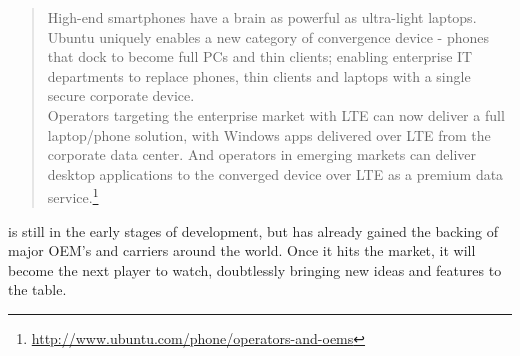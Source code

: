 \begin{quotation}
High-end smartphones have a brain as powerful as ultra-light laptops. Ubuntu uniquely enables a new category of convergence device - phones that dock to become full PCs and thin clients; enabling enterprise IT departments to replace phones, thin clients and laptops with a single secure corporate device.\\

Operators targeting the enterprise market with LTE can now deliver a full laptop/phone solution, with Windows apps delivered over LTE from the corporate data center. And operators in emerging markets can deliver desktop applications to the converged device over LTE as a premium data service.\footnote{\url{http://www.ubuntu.com/phone/operators-and-oems}}
\end{quotation}


 is still in the early stages of development, but has already gained the backing of major OEM's and carriers around the world. Once it hits the market, it will become the next player to watch, doubtlessly bringing new ideas and features to the table.  
















 